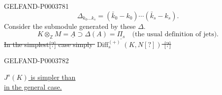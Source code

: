 \begin{GelfandAdjacentEvidence}{GELFAND-P000378}{1}
\begin{equation*}\Delta_{k_0\ldots k_s}=(\bar k_0-k_0)\cdots (\bar k_s-k_s).\end{equation*}
Consider the submodule generated by these $\Delta$.
\begin{equation*}K\otimes_{\mathbb Z}M=\underline A\supset\Delta (A)=\underline{\Pi_s}\quad\text{(the usual definition of jets).}\end{equation*}
\sout{In the simplest[?] case simply $\operatorname{Diff}_s^{(+)}(K, N[?])$ [?]}
\end{GelfandAdjacentEvidence}
\begin{GelfandAdjacentEvidence}{GELFAND-P000378}{2}

\end{GelfandAdjacentEvidence}

\begin{flushright}\underline{$J^s (K)$ is simpler than}\\\underline{in the general case.}\end{flushright}



